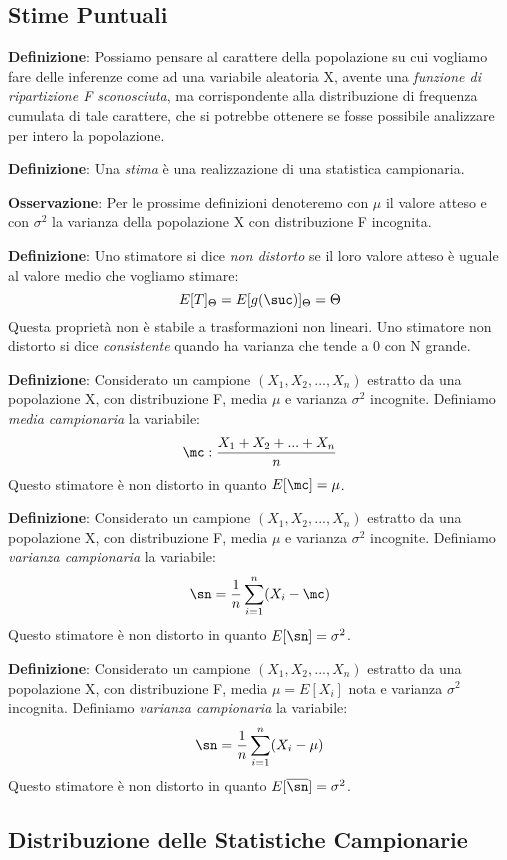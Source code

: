 \subsection{Stime Puntuali}

\textbf{Definizione}: Possiamo pensare al carattere della popolazione su cui vogliamo fare delle inferenze come ad una variabile aleatoria X, avente una \textit{funzione di ripartizione F sconosciuta}, ma corrispondente alla distribuzione di frequenza cumulata di tale carattere, che si potrebbe ottenere se fosse possibile analizzare per intero la popolazione. \n

\ind \textbf{Definizione}: Una \textit{stima} è una realizzazione di una statistica campionaria. \n

\ind \textbf{Osservazione}: Per le prossime definizioni denoteremo con $\mu$ il valore atteso e con $\sigma^2$ la varianza della popolazione X con distribuzione F incognita. \n

\ind \textbf{Definizione}: Uno stimatore si dice \textit{non distorto} se il loro valore atteso è uguale al valore medio che vogliamo stimare: $$E[T]_{\Theta} = E[g(\suc)]_{\Theta} = \Theta$$ Questa proprietà non è stabile a trasformazioni non lineari. Uno stimatore non distorto si dice \textit{consistente} quando ha varianza che tende a 0 con N grande. \n

\ind \textbf{Definizione}: Considerato un campione $(X_1, X_2, ..., X_n)$ estratto da una popolazione X, con distribuzione F, media $\mu$ e varianza $\sigma^2$ incognite. Definiamo \textit{media campionaria} la variabile: $$\mc : \frac{X_1 + X_2 + ... + X_n}{n}$$ Questo stimatore è non distorto in quanto $E[\mc]=\mu$. \n

\ind \textbf{Definizione}: Considerato un campione $(X_1, X_2, ..., X_n)$ estratto da una popolazione X, con distribuzione F, media $\mu$ e varianza $\sigma^2$ incognite. Definiamo \textit{varianza campionaria} la variabile: $$\sn = \dfrac{1}{n} \sum_{i=1}^n(X_i - \mc) $$ Questo stimatore è non distorto in quanto $E[\sn]=\sigma^2$. \n

\ind \textbf{Definizione}: Considerato un campione $(X_1, X_2, ..., X_n)$ estratto da una popolazione X, con distribuzione F, media $\mu=E[X_i]$ nota e varianza $\sigma^2$ incognita. Definiamo \textit{varianza campionaria} la variabile: $$\sn = \dfrac{1}{n} \sum_{i=1}^n(X_i - \mu) $$ Questo stimatore è non distorto in quanto $E[\overline{\sn}]=\sigma^2$. \n

\subsection{Distribuzione delle Statistiche Campionarie}

